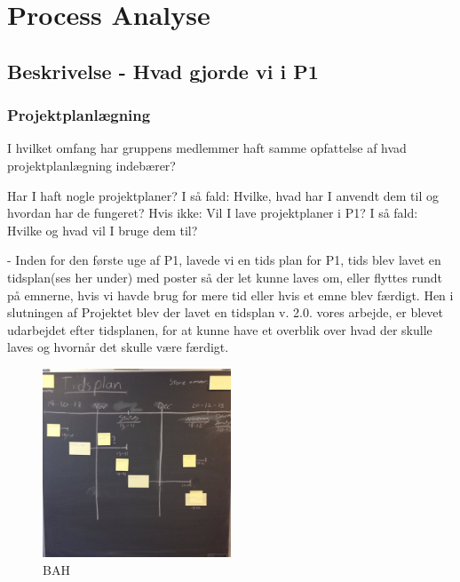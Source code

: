 \documentclass[a4paper,12pt,twoside,openright]{memoir}
\begin{document}
\chapter{Process Analyse}

    \section{Beskrivelse - Hvad gjorde vi i P1} 

        \subsection{Projektplanlægning}
I hvilket omfang har gruppens medlemmer haft samme opfattelse af hvad projektplanlægning indebærer? 


            Har I haft nogle projektplaner? I så fald: Hvilke, hvad har I anvendt dem til og hvordan har de fungeret? Hvis ikke: Vil I lave projektplaner i P1? I så fald: Hvilke og hvad vil I bruge dem til? 

            - Inden for den første uge af P1, lavede vi en tids plan for P1, tids blev lavet en tidsplan(ses her under) med poster så der let kunne laves om, eller flyttes rundt på emnerne, hvis vi havde brug for mere tid eller hvis et emne blev færdigt. Hen i slutningen af Projektet blev der lavet  en tidsplan v. 2.0. vores arbejde, er blevet udarbejdet  efter tidsplanen, for at kunne have et overblik over hvad der skulle laves og hvornår det skulle være færdigt.


            \begin{figure}[ht!]
                \centering
                \includegraphics[width=0.5\textwidth]{Images/9.jpg}
                \caption{BAH}
                \label{4}
            \end{figure}
\end{document}
